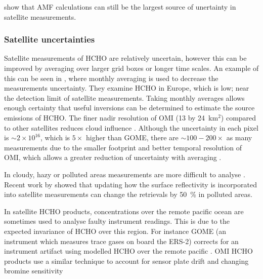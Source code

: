       \citet{Lorente2017} show that AMF calculations can still be the largest source of unertainty in satellite measurements.
      
    \subsubsection{Satellite uncertainties}
      Satellite measurements of HCHO are relatively uncertain, however this can be improved by averaging over larger grid boxes or longer time scales.
      An example of this can be seen in \citet{Dufour2009}, where monthly averaging is used to decrease the measurements uncertainty.
      They examine HCHO in Europe, which is low; near the detection limit of satellite measurements.
      Taking monthly averages allows enough certainty that useful inversions can be determined to estimate the source emissions of HCHO.
      The finer nadir resolution of OMI (13 by 24~km${^2}$) compared to other satellites reduces cloud influence \citep{Millet2006, Millet2008}. 
      Although the uncertainty in each pixel is $\sim 2 \times 10^{16}$, which is $5 \times$ higher than GOME, there are $\sim 100-200 \times $ as many measurements due to the smaller footprint and better temporal resolution of OMI, which allows a greater reduction of uncertainty with averaging \citep{Chance2002,Millet2008}.
      
      In cloudy, hazy or polluted areas measurements are more difficult to analyse \citep[e.g.][]{Palmer2003,Marais2014}.
      Recent work by \cite{Vasilkov2017} showed that updating how the surface reflectivity is incorporated into satellite measurements can change the retrievals by 50~\% in polluted areas.
      
      In satellite HCHO products, concentrations over the remote pacific ocean are sometimes used to analyse faulty instrument readings.
      This is due to the expected invariance of HCHO over this region.
      For instance GOME (an instrument which measures trace gases on board the ERS-2) corrects for an instrument artifact using modelled HCHO over the remote pacific \citep{Shim2015}.
      OMI HCHO products use a similar technique to account for sensor plate drift and changing bromine sensitivity \citep{Abad2015}
      
